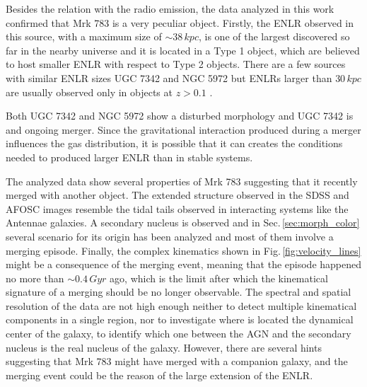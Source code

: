 \documentclass[../main.tex]{subfiles}
\begin{document}

Besides the relation with the radio emission, the data analyzed in this work confirmed that Mrk 783 is a very peculiar object.
Firstly, the ENLR observed in this source, with a maximum size of $\sim 38\,\si{kpc}$, is one of the largest discovered so far in the nearby universe and it is located in a Type 1 object, which are believed to host smaller ENLR \citep{Schmitt03b} with respect to Type 2 objects.
There are a few sources with similar ENLR sizes UGC 7342 and NGC 5972 \citep[$37$ and $33$ kpc respectively][]{Keel12} but ENLRs larger than $30\,\si{kpc}$ are usually observed only in objects at $z>0.1$ \citep[e.g.][]{Stockton87,Humphrey10,Sun18}.

Both UGC 7342 and NGC 5972 show a disturbed morphology and UGC 7342 is and ongoing merger.
Since the gravitational interaction produced during a merger influences the gas distribution, it is possible that it can creates the conditions needed to produced larger ENLR than in stable systems.

The analyzed data show several properties of Mrk 783 suggesting that it recently merged with another object.
The extended structure observed in the SDSS and AFOSC images resemble the tidal tails observed in interacting systems like the Antennae galaxies.
A secondary nucleus is observed and in Sec.\,\ref{sec:morph_color} several scenario for its origin has been analyzed and most of them involve a merging episode.
Finally, the complex kinematics shown in Fig.\,\ref{fig:velocity_lines} might be a consequence of the merging event, meaning that the episode happened no more than $\sim 0.4\,\si{Gyr}$ ago, which is the limit after which the kinematical signature of a merging should be no longer observable.
The spectral and spatial resolution of the data are not high enough neither to detect multiple kinematical components in a single region, nor to investigate where is located the dynamical center of the galaxy, to identify which one between the AGN and the secondary nucleus is the real nucleus of the galaxy.
However, there are several hints suggesting that Mrk 783 might have merged with a companion galaxy, and the merging event could be the reason of the large extension of the ENLR.
\end{document}
